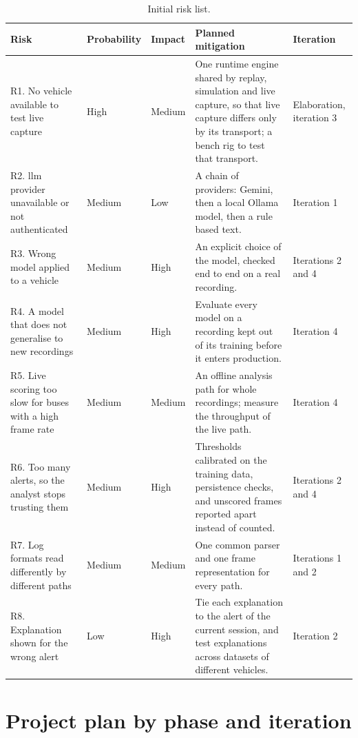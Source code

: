 \begin{table}[H]
\centering
\small
\caption{Initial risk list.}
\label{tab:risks}
\begin{tabularx}{\textwidth}{|P{3.0cm}|P{1.85cm}|P{1.3cm}|Y|P{2.05cm}|}
\hline
\textbf{Risk} & \textbf{Probability} & \textbf{Impact} & \textbf{Planned mitigation} & \textbf{Iteration} \\
\hline
R1. No vehicle available to test live capture & High & Medium & One runtime engine shared by replay, simulation and live capture, so that live capture differs only by its transport; a bench rig to test that transport. & Elaboration, iteration 3 \\
\hline
R2. \gls{llm} provider unavailable or not authenticated & Medium & Low & A chain of providers: Gemini, then a local Ollama model, then a rule based text. & Iteration 1 \\
\hline
R3. Wrong model applied to a vehicle & Medium & High & An explicit choice of the model, checked end to end on a real recording. & Iterations 2 and 4 \\
\hline
R4. A model that does not generalise to new recordings & Medium & High & Evaluate every model on a recording kept out of its training before it enters production. & Iteration 4 \\
\hline
R5. Live scoring too slow for buses with a high frame rate & Medium & Medium & An offline analysis path for whole recordings; measure the throughput of the live path. & Iteration 4 \\
\hline
R6. Too many alerts, so the analyst stops trusting them & Medium & High & Thresholds calibrated on the training data, persistence checks, and unscored frames reported apart instead of counted. & Iterations 2 and 4 \\
\hline
R7. Log formats read differently by different paths & Medium & Medium & One common parser and one frame representation for every path. & Iterations 1 and 2 \\
\hline
R8. Explanation shown for the wrong alert & Low & High & Tie each explanation to the alert of the current session, and test explanations across datasets of different vehicles. & Iteration 2 \\
\hline
\end{tabularx}
\end{table}

\section{Project plan by phase and iteration}
\label{sec:plan}

